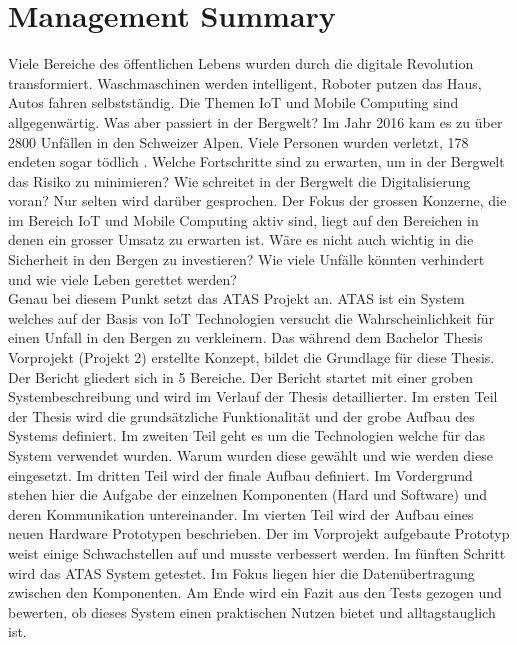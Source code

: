 \documentclass[11pt,english,german]{report}
\theoremstyle{definition}
\begin{document}
\tableofcontents

\chapter*{Management Summary}
Viele Bereiche des öffentlichen Lebens wurden durch die digitale Revolution transformiert. Waschmaschinen werden intelligent, Roboter putzen das Haus, Autos fahren selbstständig. Die Themen \gls{IoT} und Mobile Computing sind allgegenwärtig. Was aber passiert in der Bergwelt? Im Jahr 2016 kam es zu über 2800 Unfällen in den Schweizer Alpen. Viele Personen wurden verletzt, 178 endeten sogar tödlich \cite{sacaccident}. Welche Fortschritte sind zu erwarten, um in der Bergwelt das Risiko zu minimieren? Wie schreitet in der Bergwelt die Digitalisierung voran? Nur selten wird darüber gesprochen. Der Fokus der grossen Konzerne, die im Bereich IoT und Mobile Computing aktiv sind, liegt auf den Bereichen in denen ein grosser Umsatz zu erwarten ist. Wäre es nicht auch wichtig in die Sicherheit in den Bergen zu investieren? Wie viele Unfälle könnten verhindert und wie viele Leben gerettet werden?\\[0.3cm]
Genau bei diesem Punkt setzt das \gls{ATAS} Projekt an. ATAS ist ein System welches auf der Basis von IoT Technologien versucht die Wahrscheinlichkeit für einen Unfall in den Bergen zu verkleinern. Das während dem Bachelor Thesis Vorprojekt (Projekt 2) erstellte Konzept, bildet die Grundlage für diese Thesis.\\[0.3cm] Der Bericht gliedert sich in 5 Bereiche. Der Bericht startet mit einer groben Systembeschreibung und wird im Verlauf der Thesis detaillierter. Im ersten Teil der Thesis wird die grundsätzliche Funktionalität und der grobe Aufbau des Systems definiert. Im zweiten Teil geht es um die Technologien welche für das System verwendet wurden. Warum wurden diese gewählt und wie werden diese eingesetzt. Im dritten Teil wird der finale Aufbau definiert. Im Vordergrund stehen hier die Aufgabe der einzelnen Komponenten (Hard und Software) und deren Kommunikation untereinander. Im vierten Teil wird der Aufbau eines neuen Hardware Prototypen beschrieben. Der im Vorprojekt aufgebaute Prototyp weist einige Schwachstellen auf und musste verbessert werden. Im fünften Schritt wird das ATAS System getestet. Im Fokus liegen hier die Datenübertragung zwischen den Komponenten. Am Ende wird ein Fazit aus den Tests gezogen und bewerten, ob dieses System einen praktischen Nutzen bietet und alltagstauglich ist.
\end{document}
